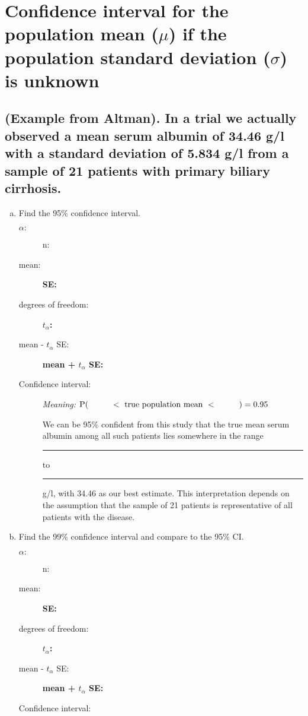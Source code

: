 \section[Confidence interval for the population mean if the population SD is unknown]{
Confidence interval for the population mean ($\mu$)
if the population standard deviation ($\sigma$) is unknown
}
	
	
\subsection{(Example from Altman). In a trial we actually observed a mean serum albumin of 34.46 g/l with a standard deviation of 5.834 g/l from a sample of 21 patients with primary biliary cirrhosis. }


\begin{enumerate}[a)]
\item Find the 95\% confidence interval.

	\begin{description}
	\item[$\alpha:$] \hrulefill\quad n: 	\hrulefill
	\item[mean:] \hrulefill\quad \textbf{SE:} \hrulefill
	\item[degrees of freedom:]  \hrulefill\quad \textbf{$t_\alpha$:} \hrulefill
	\item[mean - $t_\alpha$ SE:] \hrulefill \quad\quad \textbf{mean + $t_\alpha$ SE:} \hrulefill
	\item[Confidence interval:] \hrulefill
		
		\textit{Meaning:} $\P(\hspace{3em}< \textrm{ true population mean } < \hspace{3em}) = 0.95$

		We can be 95\% confident from this study that the true mean serum albumin among all such patients lies somewhere in the range \rule{15mm}{.4pt} to \rule{15mm}{.4pt} g/l, with 34.46 as our best estimate. This interpretation depends on the assumption that the sample of 21 patients is representative of all patients with the disease.
	\end{description}

\clearpage
\item Find the 99\% confidence interval and compare to the 95\% CI.
	\begin{description}
	\item[$\alpha:$] \hrulefill\quad n: 	\hrulefill
	\item[mean:] \hrulefill\quad \textbf{SE:} \hrulefill
	\item[degrees of freedom:]  \hrulefill\quad \textbf{$t_\alpha$:} \hrulefill
	\item[mean - $t_\alpha$ SE:] \hrulefill \quad\quad \textbf{mean + $t_\alpha$ SE:} \hrulefill
	\item[Confidence interval:] \hrulefill
		

\end{description}
\end{enumerate}
